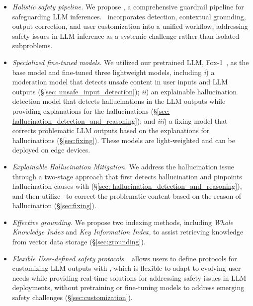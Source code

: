 \begin{itemize}[leftmargin=16pt, itemsep=1pt]
    \item \textit{Holistic safety pipeline. }We propose \goodname, a comprehensive guardrail pipeline for safeguarding LLM inferences. \goodname~incorporates
detection, contextual grounding, output correction, and user customization into a unified workflow, addressing safety issues in LLM inference as a systemic challenge rather than isolated subproblems.

\item \textit{Specialized fine-tuned models. } We utilized our pretrained LLM, Fox-1~\cite{fox}, as the base model and fine-tuned three lightweight models, including  \textit{i}) a  moderation model that detects unsafe content in user inputs and LLM outputs (\S\ref{sec: unsafe_input_detection}); 
\textit{ii}) an explainable hallucination detection model that detects hallucinations in the LLM outputs while providing explanations for the hallucinations (\S\ref{sec: hallucination_detection_and_reasoning}); and \textit{iii}) a fixing model that corrects problematic LLM outputs based on the explanations for hallucinations (\S\ref{sec:fixing}).
These models are light-weighted and can be deployed on edge devices.


\item\textit{Explainable Hallucination Mitigation. } We address the hallucination issue through a two-stage approach that first detects hallucination and pinpoints hallucination causes
with \detection (\S\ref{sec: hallucination_detection_and_reasoning}), and then utilize \fixing~to correct the problematic content based on the reason of hallucination (\S\ref{sec:fixing}).



\item\textit{Effective grounding. } We propose two indexing methods, including \textit{Whole Knowledge Index} and \textit{Key Information
Index}, to assist retrieving knowledge from vector data storage  (\S\ref{sec:grounding}). 



\item\textit{Flexible User-defined safety protocols. } \goodname~allows users to define protocols for customizing LLM outputs with
\customization, which is flexible to adapt to evolving user needs while
providing real-time solutions for addressing safety issues in LLM
deployments, without pretraining or fine-tuning models to address
emerging safety challenges (\S\ref{sec:customization}).


\end{itemize}
